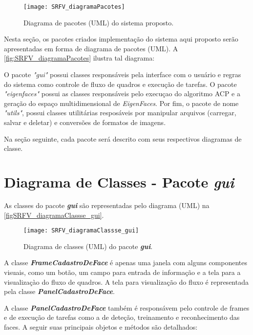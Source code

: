 \begin{figure}[h]
	\centering
	\texttt{[image: SRFV\_diagramaPacotes]}
	\caption{Diagrama de pacotes (UML) do sistema proposto.}
	\label{fig:SRFV_diagramaPacotes}
\end{figure}

Nesta seção, os pacotes criados implementação do sistema aqui proposto serão apresentadas em forma de diagrama de pacotes (UML). A \autoref{fig:SRFV_diagramaPacotes} ilustra tal diagrama:



O pacote \textit{"gui"} possui classes responsáveis pela interface com o usuário e regras do sistema como controle de fluxo de quadros e execução de tarefas. O pacote \textit{"eigenfaces"} possui as classes responsáveis pelo execuçao do algoritmo ACP e a geração do espaço multidimensional de \textit{EigenFaces}. Por fim, o pacote de nome \textit{"utils"}, possui classes utilitárias resposáveis por manipular arquivos (carregar, salvar e deletar) e conversões de formatos de imagens. 

Na seção seguinte, cada pacote será descrito com seus respectivos diagramas de classe.

\section{Diagrama de Classes - Pacote \textit{\textbf{gui}}}\label{sec:diagclasses}
As classes do pacote \textbf{\textit{gui}} são representadas pelo diagrama (UML) na \autoref{figSRFV_diagramaClassse_gui}.

\begin{figure}[h]
	\centering
	\texttt{[image: SRFV\_diagramaClassse\_gui]}
	\caption{Diagrama de classes (UML) do pacote \textbf{\textit{gui}}.}
	\label{figSRFV_diagramaClassse_gui}
\end{figure}

A classe \textbf{\textit{FrameCadastroDeFace}} é apenas uma janela com alguns componentes visuais, como um botão, um campo para entrada de informação e a tela para a visualizaçào do fluxo de quadros. A tela para visualização do fluxo é representada pela classe \textbf{\textit{PanelCadastroDeFace}}.

A classe \textbf{\textit{PanelCadastroDeFace}} também é responsávem pelo controle de frames e de execução de tarefas como a de deteção, treinamento e reconhecimento das faces. A seguir suas principais objetos e métodos são detalhados:

